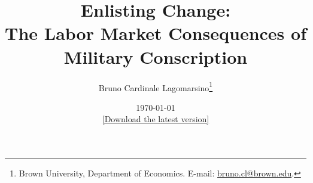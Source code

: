 \documentclass[12pt]{article}
\begin{document}
\begin{titlepage}

\title{\textbf{Enlisting Change:} \\ \Large The Labor Market Consequences of Military Conscription}

\author{Bruno Cardinale Lagomarsino\thanks{Brown University, Department of Economics. E-mail: \href{mailto:bruno.cl@brown.edu}{bruno.cl@brown.edu}.}}

\date{\today \\[0.2em] \href{https://www.brunocardinalelagomarsino.com/research}{[Download the latest version]}}

\maketitle

\end{titlepage}
\end{document}
